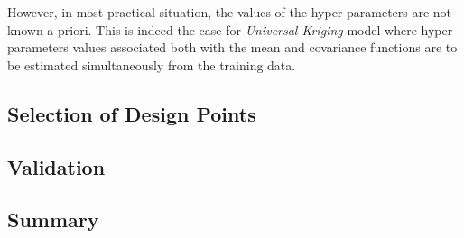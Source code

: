 However, in most practical situation, the values of the hyper-parameters are not known a priori.
This is indeed the case for \emph{Universal Kriging} model where hyper-parameters values associated both with the mean and covariance functions are to be estimated simultaneously from the training data.





\subsection{Selection of Design Points}\label{sub:gp_design}

\subsection{Validation}\label{sub:gp_validation}

\subsection{Summary}\label{sub:gp_summary}